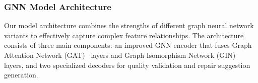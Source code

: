 




\subsubsection{\textbf{GNN Model Architecture}}
Our model architecture combines the strengths of different graph neural network variants to effectively capture complex feature relationships. 
The architecture consists of three main components: an improved GNN encoder that fuses Graph Attention Network (GAT)~\cite{velivckovic2017graph} layers and Graph Isomorphism Network (GIN)~\cite{xu2018powerful} layers, and two specialized decoders for quality validation and repair suggestion generation.

